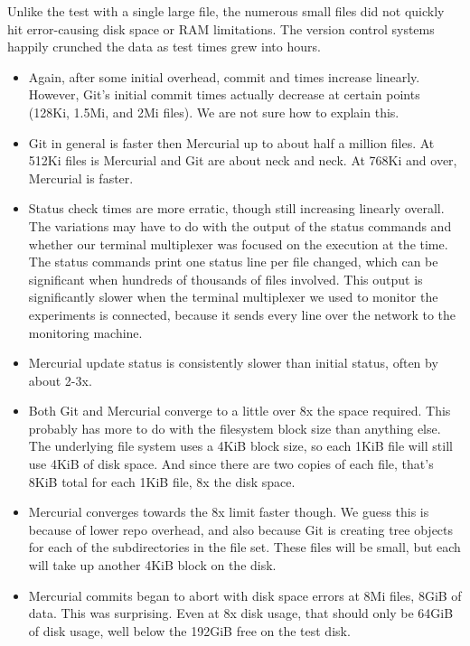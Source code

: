 
Unlike the test with a single large file, the numerous small files did not
quickly hit error-causing disk space or RAM limitations. The version control
systems happily crunched the data as test times grew into hours.

\begin{itemize}

    \item Again, after some initial overhead, commit and times increase
        linearly. However, Git's initial commit times actually decrease at
        certain points (128Ki, 1.5Mi, and 2Mi files). We are not sure how to
        explain this.

    \item Git in general is faster then Mercurial up to about half a million
        files. At 512Ki files is Mercurial and Git are about neck and neck. At
        768Ki and over, Mercurial is faster.

    \item Status check times are more erratic, though still increasing linearly
        overall. The variations may have to do with the output of the status
        commands and whether our terminal multiplexer was focused on the
        execution at the time. The status commands print one status line per
        file changed, which can be significant when hundreds of thousands of
        files involved. This output is significantly slower when the terminal
        multiplexer we used to monitor the experiments is connected, because it
        sends every line over the network to the monitoring machine.

    \item Mercurial update status is consistently slower than initial status,
        often by about 2-3x.

    \item Both Git and Mercurial converge to a little over 8x the space
        required. This probably has more to do with the filesystem block size
        than anything else. The underlying file system uses a 4KiB block size,
        so each 1KiB file will still use 4KiB of disk space. And since there are
        two copies of each file, that's 8KiB total for each 1KiB file, 8x the
        disk space.

    \item Mercurial converges towards the 8x limit faster though. We guess this
        is because of lower repo overhead, and also because Git is creating tree
        objects for each of the subdirectories in the file set. These files will
        be small, but each will take up another 4KiB block on the disk.

    \item Mercurial commits began to abort with disk space errors at 8Mi files,
        8GiB of data. This was surprising. Even at 8x disk usage, that should
        only be 64GiB of disk usage, well below the 192GiB free on the test
        disk.

\end{itemize}

%
